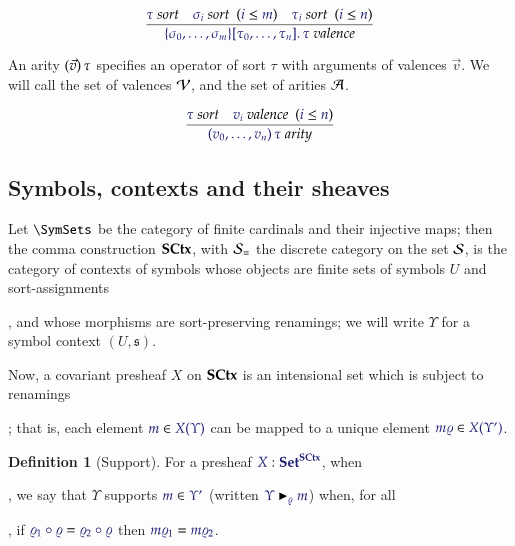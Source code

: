 \documentclass[11pt]{article}
\theoremstyle{definition}
\newtheorem{definition}[thm]{Definition}
\theoremstyle{remark}
\numberwithin{equation}{section}
\newcommand\SupportsUnmoded[3]{#1 \blacktriangleright_{#2} #3}
\newcommand\Supports[3]{\SupportsUnmoded{\IMode{#1}}{\IMode{#2}}{\IMode{#3}}}
\begin{document}
\[
  \infer{
    \IsValence{
      \MkValence
        {\sigma_0,\dots,\sigma_m}
        {\tau_0,\dots,\tau_n}
        {\tau}
    }
  }{
    \IsSort{\tau}
&
    \HypJ{\IsSort{\sigma_i}}{\Leq{i}{m}}
&
    \HypJ{\IsSort{\tau_i}}{\Leq{i}{n}}
  }
\]

An arity $(\vec{v})\, \tau$ specifies an operator of sort $\tau$ with
arguments of valences $\vec{v}$. We will call the set of valences $\mathcal{V}$,
and the set of arities $\mathcal{A}$.

\[
  \infer{
    \IsArity{
      \MkArity
        {v_0,\ldots,v_n}
        {\tau}
    }
  }{
    \IsSort{\tau}
&
    \HypJ
      {\IsValence{v_i}}
      {\Leq{i}{n}}
  }
\]

\subsection{Symbols, contexts and their sheaves}

Let $\SymSets$ be the category of finite cardinals and their injective maps;
then the comma construction $\mathbf{SCtx}$, with $\mathcal{S}_{\equiv}$
the discrete category on the set $\mathcal{S}$, is the category of contexts of
symbols whose objects are finite sets of symbols $U$ and sort-assignments
, and whose morphisms are
sort-preserving renamings; we will write $\Upsilon$ for a symbol context
$(U,\mathfrak{s})$.

Now, a covariant presheaf $X$ on $\mathbf{SCtx}$ is an intensional set which is subject
to renamings
;
that is, each element $\Member{m}{X(\Upsilon)}$ can be mapped to a unique
element $\Member{m\varrho}{X(\Upsilon')}$.

\begin{definition}[Support]
  For a presheaf $\Of{X}{\Sets^\SCtx}$, when
  ,
  we say that $\Upsilon$ supports $\Member{m}{\Upsilon'}$ (written
  $\Supports{\Upsilon}{\varrho}{m}$) when, for all
  ,
  if $\IsEq{\varrho_1\circ\varrho}{\varrho_2\circ\varrho}$ then $\IsEq{m\varrho_1}{m\varrho_2}$.
\end{definition}
\end{document}
